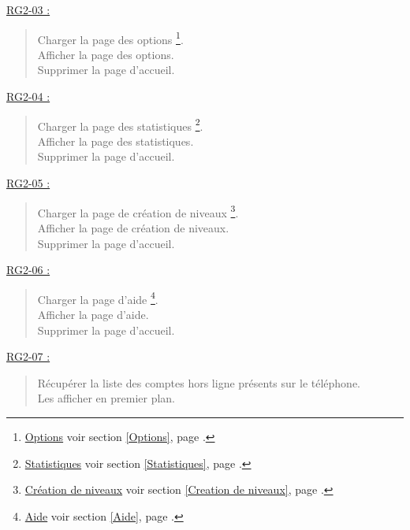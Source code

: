 \documentclass{report}
\begin{document}
		
		\underline{RG2-03 :}
			\begin{quote}
				Charger la page des options%
					\footnote{
						\hyperlink{Options}{Options}
						\og voir section \ref{Options}, page \pageref{Options}.\fg
					}.\\
				Afficher la page des options\footnotemark[5].\\			
				Supprimer la page d'accueil\footnotemark[2].\\	
			\end{quote}


		\underline{RG2-04 :}
			\begin{quote}
				Charger la page des statistiques%
					\footnote{
						\hyperlink{Statistiques}{Statistiques}
						\og voir section \ref{Statistiques}, page \pageref{Statistiques}.\fg
					}.\\
				Afficher la page des statistiques\footnotemark[6].\\				
				Supprimer la page d'accueil\footnotemark[2].\\		
			\end{quote}


		\underline{RG2-05 :}
			\begin{quote}
				Charger la page de création de niveaux%
					\footnote{
						\hyperlink{Creation de niveaux}{Création de niveaux}
						\og voir section \ref{Creation de niveaux}, page \pageref{Creation de niveaux}.\fg
					}.\\
				Afficher la page de création de niveaux\footnotemark[7].\\
				Supprimer la page d'accueil\footnotemark[2].\\		
			\end{quote}


		\underline{RG2-06 :}
			\begin{quote}
				Charger la page d'aide%
					\footnote{
						\hyperlink{Aide}{Aide}
						\og voir section \ref{Aide}, page \pageref{Aide}.\fg
					}.\\
				Afficher la page d'aide\footnotemark[8].\\
				Supprimer la page d'accueil\footnotemark[2].\\		
			\end{quote}
			
			
		\underline{RG2-07 :}
			\begin{quote}
				Récupérer la liste des comptes hors ligne présents sur le téléphone.\\
				Les afficher en premier plan.\\
			\end{quote}			
\end{document}
